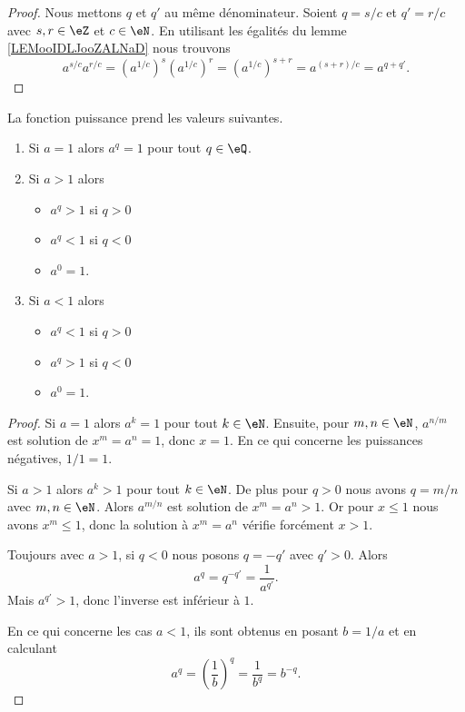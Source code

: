 \begin{proof}
    Nous mettons \( q\) et \( q'\) au même dénominateur. Soient \( q=s/c\) et \( q'=r/c\) avec \( s,r\in \eZ\) et \( c\in \eN\). En utilisant les égalités du lemme \ref{LEMooIDLJooZALNaD} nous trouvons
    \begin{equation}
        a^{s/c}a^{r/c}=(a^{1/c})^s(a^{1/c})^r=(a^{1/c})^{s+r}=a^{(s+r)/c}=a^{q+q'}.
    \end{equation}
\end{proof}

\begin{lemma}        \label{LEMooXJXUooLoiTMo}
    La fonction puissance prend les valeurs suivantes.
    \begin{enumerate}
        \item
            Si \( a=1\) alors \( a^q=1\) pour tout \( q\in \eQ\).
        \item
            Si \( a>1\) alors 
            \begin{itemize}
                \item \( a^q>1\) si \( q>0\)
                \item \( a^q<1\) si \( q<0\)
                \item \( a^0=1\).
            \end{itemize}
        \item
            Si \( a<1\) alors 
            \begin{itemize}
                \item \( a^q<1\) si \( q>0\)
                \item \( a^q>1\) si \( q<0\)
                \item \( a^0=1\).
            \end{itemize}
    \end{enumerate}
\end{lemma}

\begin{proof}
    Si \( a=1\) alors \( a^k=1\) pour tout \( k\in \eN\). Ensuite, pour \( m,n\in \eN\), \( a^{n/m}\) est solution de \( x^m=a^n=1\), donc \( x=1\). En ce qui concerne les puissances négatives, \( 1/1=1\).

    Si \( a>1\) alors \( a^k>1\) pour tout \( k\in \eN\). De plus pour \( q>0\) nous avons \( q=m/n\) avec \( m,n\in \eN\). Alors \( a^{m/n}\) est solution de \( x^m=a^n>1\). Or pour \( x\leq 1\) nous avons \( x^m\leq 1\), donc la solution à \( x^m=a^n\) vérifie forcément \( x>1\).

    Toujours avec \( a>1\), si \( q<0\) nous posons \( q=-q'\) avec \( q'>0\). Alors
    \begin{equation}
        a^q=q^{-q'}=\frac{1}{ a^{q'} }.
    \end{equation}
    Mais \( a^{q'}>1\), donc l'inverse est inférieur à \( 1\).

    En ce qui concerne les cas \( a<1\), ils sont obtenus en posant \( b=1/a\) et en calculant
    \begin{equation}
        a^q=\left( \frac{1}{ b } \right)^q=\frac{1}{ b^q }=b^{-q}.
    \end{equation}
\end{proof}

